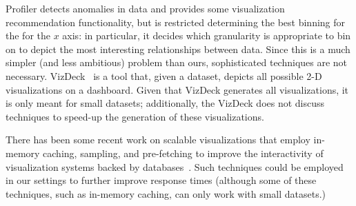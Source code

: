 Profiler 
detects anomalies in data \cite{DBLP:conf/AVI/KandelPPHH12} and provides
some visualization recommendation functionality,
but is restricted determining the best binning for the
for the $x$ axis: in particular, it decides which granularity
is appropriate to bin on to depict the most interesting relationships 
between data. 
Since this is a much simpler (and less ambitious) problem
than ours, sophisticated techniques are not necessary.
VizDeck~\cite{DBLP:conf/sigmod/KeyHPA12} is a tool that, given a dataset,
depicts all possible 2-D visualizations on a dashboard.
Given that VizDeck generates all visualizations, it is only meant for 
small datasets; additionally, the VizDeck does not discuss techniques
to speed-up the generation of these visualizations. 


  There has been some recent work on
scalable visualizations that employ in-memory caching, sampling, and
pre-fetching to improve the interactivity of visualization systems
backed by
databases~\cite{2013-immens,DBLP:conf/AVI/KandelPPHH12,hotmap,doshi2003prefetching,DBLP:journals/corr/KimBPIMR14}.
Such techniques could be employed in our settings to further improve
response times (although some of these techniques, such as in-memory caching,
can only work with small datasets.)


